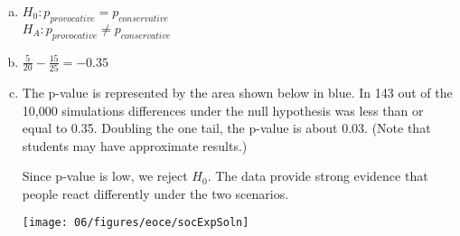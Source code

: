 {
\begin{enumerate}[(a)]
\setlength{\itemsep}{0mm}
\item $H_0: p_{provocative} = p_{conservative}$ \\
$H_A: p_{provocative} \ne p_{conservative}$
\item $\frac{5}{20} - \frac{15}{25} = -0.35$
\item The p-value is represented by the area shown below in blue. In 143 out of the 10,000 simulations differences under the null hypothesis was less than or equal to 0.35. Doubling the one tail, the p-value is about 0.03. (Note that students may have approximate results.)

\noindent \begin{minipage}[c]{0.5\textwidth}
Since p-value is low, we reject $H_0$. The data provide strong evidence that people react differently under the two scenarios.
\end{minipage}
\begin{minipage}[c]{0.5\textwidth}
\begin{center}
\texttt{[image: 06/figures/eoce/socExpSoln]}
\end{center}
\end{minipage}
\end{enumerate}
}

\pagebreak

